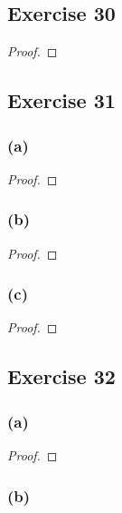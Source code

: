 \documentclass[14pt]{extarticle}
\begin{document}
\subsection{Exercise 30}

\begin{proof}

\end{proof}

\subsection{Exercise 31}

\subsubsection{(a)}

\begin{proof}

\end{proof}

\subsubsection{(b)}

\begin{proof}

\end{proof}

\subsubsection{(c)}

\begin{proof}

\end{proof}

\subsection{Exercise 32}

\subsubsection{(a)}

\begin{proof}

\end{proof}

\subsubsection{(b)}
\end{document}
